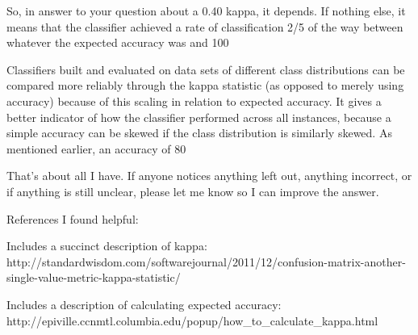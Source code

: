 \documentclass[caret-main.tex]{subfiles}
\begin{document}
So, in answer to your question about a 0.40 kappa, it depends. If nothing else, it means that the classifier achieved a rate of classification 2/5 of the way between whatever the expected accuracy was and 100%

Classifiers built and evaluated on data sets of different class distributions can be compared more reliably through the kappa statistic (as opposed to merely using accuracy) because of this scaling in relation to expected accuracy. It gives a better indicator of how the classifier performed across all instances, because a simple accuracy can be skewed if the class distribution is similarly skewed. As mentioned earlier, an accuracy of 80%

That's about all I have. If anyone notices anything left out, anything incorrect, or if anything is still unclear, please let me know so I can improve the answer.

References I found helpful:

Includes a succinct description of kappa: http://standardwisdom.com/softwarejournal/2011/12/confusion-matrix-another-single-value-metric-kappa-statistic/

Includes a description of calculating expected accuracy: http://epiville.ccnmtl.columbia.edu/popup/how_to_calculate_kappa.html
\end{document}
